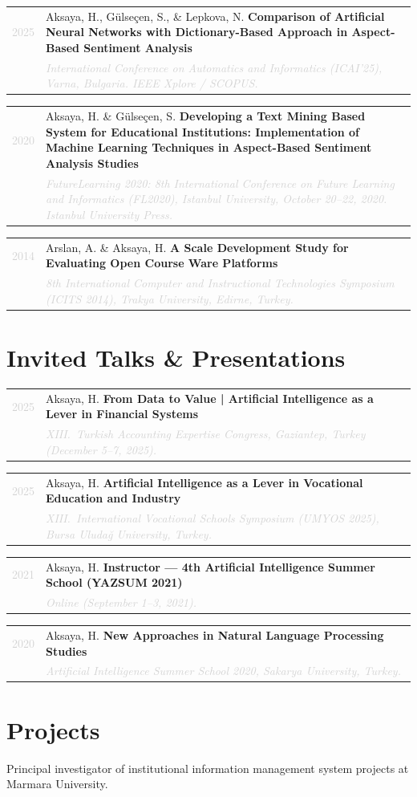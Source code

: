 \documentclass[11pt, a4paper]{article}
\makeatletter
\newcommand{\pubentry}[3]{%
  \begin{tabularx}{\textwidth}{@{}p{0.07\textwidth}X@{}}
    \textcolor{lightgray}{\small #1} & #2 \\
    & \textcolor{lightgray}{\small\itshape #3} \\
  \end{tabularx}
  \vspace{4pt}
}
\makeatother
\begin{document}
\pubentry{2025}{%
  Aksaya, H., Gülseçen, S., \& Lepkova, N.
  \textbf{Comparison of Artificial Neural Networks with Dictionary-Based Approach in Aspect-Based Sentiment Analysis}}{%
  \textit{International Conference on Automatics and Informatics (ICAI'25)}, Varna, Bulgaria. IEEE Xplore / SCOPUS.}

\pubentry{2020}{%
  Aksaya, H. \& Gülseçen, S.
  \textbf{Developing a Text Mining Based System for Educational Institutions: Implementation of Machine Learning Techniques in Aspect-Based Sentiment Analysis Studies}}{%
  \textit{FutureLearning 2020: 8th International Conference on Future Learning and Informatics (FL2020)}, Istanbul University, October 20--22, 2020. Istanbul University Press.}

\pubentry{2014}{%
  Arslan, A. \& Aksaya, H.
  \textbf{A Scale Development Study for Evaluating Open Course Ware Platforms}}{%
  \textit{8th International Computer and Instructional Technologies Symposium (ICITS 2014)}, Trakya University, Edirne, Turkey.}

\section{Invited Talks \& Presentations}

\pubentry{2025}{%
  Aksaya, H.
  \textbf{From Data to Value | Artificial Intelligence as a Lever in Financial Systems}}{%
  XIII.\ Turkish Accounting Expertise Congress, Gaziantep, Turkey (December 5--7, 2025).}

\pubentry{2025}{%
  Aksaya, H.
  \textbf{Artificial Intelligence as a Lever in Vocational Education and Industry}}{%
  XIII.\ International Vocational Schools Symposium (UMYOS 2025), Bursa Uludağ University, Turkey.}

\pubentry{2021}{%
  Aksaya, H.
  \textbf{Instructor — 4th Artificial Intelligence Summer School (YAZSUM 2021)}}{%
  Online (September 1--3, 2021).}

\pubentry{2020}{%
  Aksaya, H.
  \textbf{New Approaches in Natural Language Processing Studies}}{%
  \textit{Artificial Intelligence Summer School 2020}, Sakarya University, Turkey.}

\section{Projects}

Principal investigator of institutional information management system projects at Marmara University.
\end{document}
